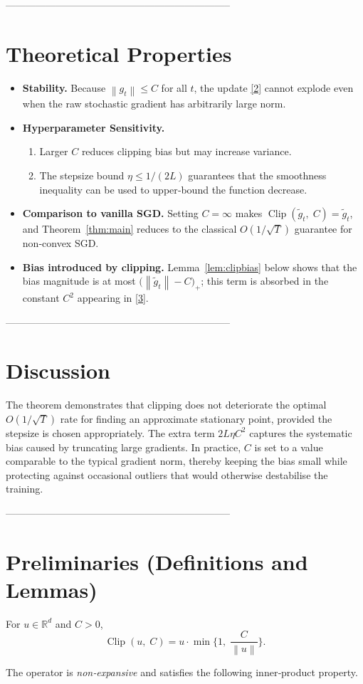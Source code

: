 \documentclass{article}
\newcommand{\clip}[2]{\operatorname{Clip}\!\left(#1,\;#2\right)}
\newcommand{\norm}[1]{\left\|#1\right\|}
\newcommand{\R}{\mathbb{R}}
\begin{document}
--------------------------------------------------------------------
\section*{Theoretical Properties}
\begin{itemize}
\item \textbf{Stability.} Because $\norm{g_t}\le C$ for all $t$, the update \eqref{2}
cannot explode even when the raw stochastic gradient has arbitrarily large norm.
\item \textbf{Hyperparameter Sensitivity.}
  \begin{enumerate}
  \item Larger $C$ reduces clipping bias but may increase variance.
  \item The stepsize bound $\eta\le 1/(2L)$ guarantees that the smoothness
        inequality can be used to upper‑bound the function decrease.
  \end{enumerate}
\item \textbf{Comparison to vanilla SGD.}
  Setting $C=\infty$ makes $\clip{\tilde g_t}{C}=\tilde g_t$, and Theorem~\ref{thm:main}
  reduces to the classical $O(1/\sqrt{T})$ guarantee for non‑convex SGD.
\item \textbf{Bias introduced by clipping.}
  Lemma~\ref{lem:clipbias} below shows that the bias magnitude is at most
  $\big(\norm{\tilde g_t}-C\big)_{+}$; this term is absorbed in the constant
  $C^{2}$ appearing in \eqref{3}.
\end{itemize}

--------------------------------------------------------------------
\section*{Discussion}
The theorem demonstrates that clipping does not deteriorate the optimal
$O(1/\sqrt{T})$ rate for finding an approximate stationary point, provided
the stepsize is chosen appropriately.  The extra term $2L\eta C^{2}$
captures the systematic bias caused by truncating large gradients.
In practice, $C$ is set to a value comparable to the typical gradient
norm, thereby keeping the bias small while protecting against occasional
outliers that would otherwise destabilise the training.

--------------------------------------------------------------------
\section*{Preliminaries (Definitions and Lemmas)}
\begin{definition}
For $u\in\R^{d}$ and $C>0$,
\[
\clip{u}{C}=u\cdot\min\Big\{1,\;\frac{C}{\norm{u}}\Big\}.
\]
\end{definition}
The operator is \emph{non‑expansive} and satisfies the following inner‑product
property.
\end{document}
